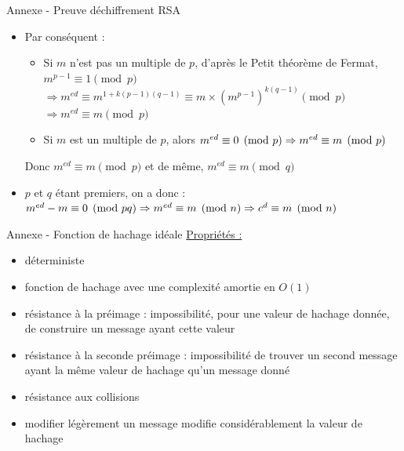 \documentclass{beamer}
\begin{document}
\begin{frame}{Annexe - Preuve déchiffrement RSA}
    \begin{itemize}
        \item Par conséquent :
        \begin{itemize}
            \item Si $m$ n'est pas un multiple de $p$,  d'après le Petit théorème de Fermat, $m^{p-1}\equiv 1 \pmod{p}$ \newline $\Rightarrow m^{ed} \equiv m^{1 + k(p-1)(q-1)} \equiv m \times (m^{p-1})^{k(q-1)} \pmod{p}$ \newline $\Rightarrow m^{ed} \equiv m \pmod{p}$
            \item Si $m$ est un multiple de $p$, alors $m^{ed} \equiv 0 \pmod{p} \newline \Rightarrow m^{ed} \equiv m \pmod{p}$ 
        \end{itemize}
        Donc $m^{ed} \equiv m \pmod{p}$ et de même, $m^{ed} \equiv m \pmod{q}$
        \item $p$ et $q$ étant premiers, on a donc : \newline
        $m^{ed}-m \equiv 0 \pmod{pq} \newline \Rightarrow m^{ed} \equiv m \pmod{n} \newline \Rightarrow c^d \equiv m \pmod{n}$
    \end{itemize}
\end{frame}

\begin{frame}{Annexe - Fonction de hachage idéale}
    \underline{Propriétés :}
    \begin{itemize}
        \item déterministe
        \item fonction de hachage avec une complexité amortie en $O(1)$
        \item résistance à la préimage : impossibilité, pour une valeur de hachage donnée, de construire un message ayant cette valeur
        \item résistance à la seconde préimage : impossibilité de trouver un second message ayant la même valeur de hachage qu'un message donné
        \item résistance aux collisions
        \item modifier légèrement un message modifie considérablement la valeur de hachage
    \end{itemize}
\end{frame}
\end{document}
